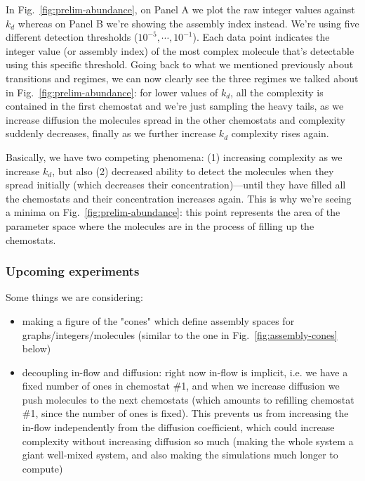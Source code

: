 \documentclass[11pt]{article}
\begin{document}
In Fig.~\ref{fig:prelim-abundance}, on Panel A we plot the raw integer values against $k_d$ whereas on Panel B we’re showing the assembly index instead. We’re using five different detection thresholds ($10^{-5},\cdots,10^{-1}$). Each data point indicates the integer value (or assembly index) of the most complex molecule that’s detectable using this specific threshold. Going back to what we mentioned previously about transitions and regimes, we can now clearly see the three regimes we talked about in Fig.~\ref{fig:prelim-abundance}: for lower values of $k_d$, all the complexity is contained in the first chemostat and we’re just sampling the heavy tails, as we increase diffusion the molecules spread in the other chemostats and complexity suddenly decreases, finally as we further increase $k_d$ complexity rises again.

Basically, we have two competing phenomena: (1) increasing complexity as we increase $k_d$, but also (2) decreased ability to detect the molecules when they spread initially (which decreases their concentration)---until they have filled all the chemostats and their concentration increases again. This is why we’re seeing a minima on Fig.~\ref{fig:prelim-abundance}: this point represents the area of the parameter space where the molecules are in the process of filling up the chemostats.

\subsubsection{Upcoming experiments}

Some things we are considering:

\begin{itemize}
	\item making a figure of the "cones" which define assembly spaces for graphs/integers/molecules (similar to the one in Fig.~\ref{fig:assembly-cones} below)
	\item decoupling in-flow and diffusion: right now in-flow is implicit, i.e. we have a fixed number of ones in chemostat \#1, and when we increase diffusion we push molecules to the next chemostats (which amounts to refilling chemostat \#1, since the number of ones is fixed). This prevents us from increasing the in-flow independently from the diffusion coefficient, which could increase complexity without increasing diffusion so much (making the whole system a giant well-mixed system, and also making the simulations much longer to compute)
\end{itemize}
\end{document}
